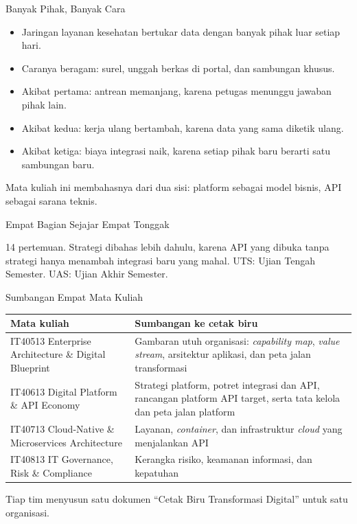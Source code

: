 \documentclass[aspectratio=169, table, 12pt]{beamer}
\begin{document}
\begin{frame}{{\Large Banyak Pihak, Banyak Cara}}
  \vspace{6pt}
  \begin{itemize}
    \item Jaringan layanan kesehatan bertukar data dengan banyak pihak luar setiap hari.
    \item Caranya beragam: surel, unggah berkas di portal, dan sambungan khusus.
    \item Akibat pertama: antrean memanjang, karena petugas menunggu jawaban pihak lain.
    \item Akibat kedua: kerja ulang bertambah, karena data yang sama diketik ulang.
    \item Akibat ketiga: biaya integrasi naik, karena setiap pihak baru berarti satu sambungan baru.
  \end{itemize}
  \vspace{4pt}
  {\small Mata kuliah ini membahasnya dari dua sisi: platform sebagai model bisnis, API sebagai sarana teknis.}
\end{frame}

\begin{frame}{{\Large Empat Bagian Sejajar Empat Tonggak}}
  \centering
  \resizebox{0.9\textwidth}{!}{}

  \vspace{4pt}
  {\footnotesize 14 pertemuan. Strategi dibahas lebih dahulu, karena API yang dibuka tanpa strategi hanya menambah integrasi baru yang mahal. UTS: Ujian Tengah Semester. UAS: Ujian Akhir Semester.\par}
\end{frame}

\begin{frame}{{\Large Sumbangan Empat Mata Kuliah}}
  \footnotesize
  \begin{tabularx}{\textwidth}{>{\raggedright\arraybackslash}p{5.0cm}
      >{\raggedright\arraybackslash}X}
    \hline
    \textbf{Mata kuliah} & \textbf{Sumbangan ke cetak biru} \\ \hline
    IT40513 Enterprise Architecture \& Digital Blueprint & Gambaran utuh organisasi: \textit{capability map}, \textit{value stream}, arsitektur aplikasi, dan peta jalan transformasi \\ \hline
    IT40613 Digital Platform \& API Economy & Strategi platform, potret integrasi dan API, rancangan platform API target, serta tata kelola dan peta jalan platform \\ \hline
    IT40713 Cloud-Native \& Microservices Architecture & Layanan, \textit{container}, dan infrastruktur \textit{cloud} yang menjalankan API \\ \hline
    IT40813 IT Governance, Risk \& Compliance & Kerangka risiko, keamanan informasi, dan kepatuhan \\ \hline
  \end{tabularx}

  \vspace{8pt}
  \small Tiap tim menyusun satu dokumen ``Cetak Biru Transformasi Digital'' untuk satu organisasi.
\end{frame}
\end{document}
